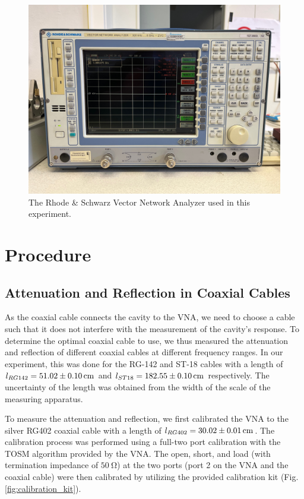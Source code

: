 \documentclass[a4paper]{article}
\numberwithin{equation}{section}
\begin{document}
\begin{figure}[hbt!]
	\centering
	\includegraphics[width=0.5\columnwidth]{VNA.jpg}
	\caption{The Rhode \& Schwarz Vector Network Analyzer used in this experiment.}

	\label{fig:VNA}
\end{figure}

\section{Procedure}

\subsection{Attenuation and Reflection in Coaxial Cables}

As the coaxial cable connects the cavity to the VNA, we need to choose a cable
such that it does not interfere with the measurement of the cavity's response.
To determine the optimal coaxial cable to use, we thus measured the attenuation
and reflection of different coaxial cables at different frequency ranges. In our
experiment, this was done for the RG-142 and ST-18 cables with a length of
$l_{RG142}=\SI{51.02 \pm 0.10}{\centi\meter}$ and $l_{ST18}=\SI{182.55 \pm
0.10}{\centi\meter}$ respectively. The uncertainty of the length was obtained
from the width of the scale of the measuring apparatus. \par 

To measure the attenuation and reflection, we first calibrated the VNA to the
silver RG402 coaxial cable with a length of $l_{RG402} = \SI{30.02 \pm
0.01}{\centi\meter}$. The calibration process was performed using a full-two
port calibration with the TOSM algorithm provided by the VNA. The open, short,
and load (with termination impedance of $\SI{50}{\ohm}$) at the two ports (port
2 on the VNA and the coaxial cable) were then calibrated by utilizing the
provided calibration kit (Fig. \ref{fig:calibration_kit}). 
\end{document}
